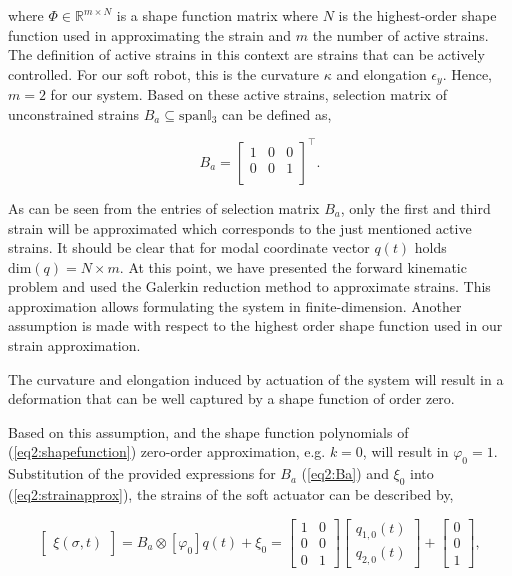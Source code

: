 where $\Phi \in \mathbb{R}^{m \times N}$ is a shape function matrix where $N$ is the highest-order shape function used in approximating the strain and $m$ the number of active strains. The definition of active strains in this context are strains that can be actively controlled. For our soft robot, this is the curvature $\kappa$ and elongation $\epsilon_y$. Hence, $m=2$ for our system. Based on these active strains, selection matrix of unconstrained strains $B_a \subseteq \text{span} \mathbb{I}_3$ can be defined as,

\begin{equation}
    B_a = \begin{bmatrix}
    1 & 0 & 0  \\
    0 & 0 & 1  \\
    \end{bmatrix}^\top.
    \label{eq2:Ba}
\end{equation}

As can be seen from the entries of selection matrix $B_a$, only the first and third strain will be approximated which corresponds to the just mentioned active strains. It should be clear that for modal coordinate vector $q(t)$ holds $\text{dim}(q) = N \times m $. At this point, we have presented the forward kinematic problem and used the Galerkin reduction method to approximate strains. This approximation allows formulating the system in finite-dimension. Another assumption is made with respect to the highest order shape function used in our strain approximation.

\begin{theorem}
The curvature and elongation induced by actuation of the system will result in a deformation that can be well captured by a shape function of order zero.
\end{theorem}

Based on this assumption, and the shape function polynomials of (\ref{eq2:shapefunction}) zero-order approximation, e.g. $k=0$, will result in $\varphi_0 = 1$. Substitution of the provided expressions for $B_a$ (\ref{eq2:Ba}) and $\xi_0$ into (\ref{eq2:strainapprox}), the strains of the soft actuator can be described by,


\begin{equation}
    \begin{bmatrix}\xi(\sigma,t)\end{bmatrix} =B_a \otimes [\varphi_0] q(t) + \xi_0  =  \begin{bmatrix}
    1 & 0  \\
    0 & 0  \\
    0 & 1
    \end{bmatrix} \begin{bmatrix} q_{1,0}(t) \\  q_{2,0}(t) \end{bmatrix} +  \begin{bmatrix} 0 \\ 0 \\ 1   \end{bmatrix},
\label{eq2:xiapprox}
\end{equation}

